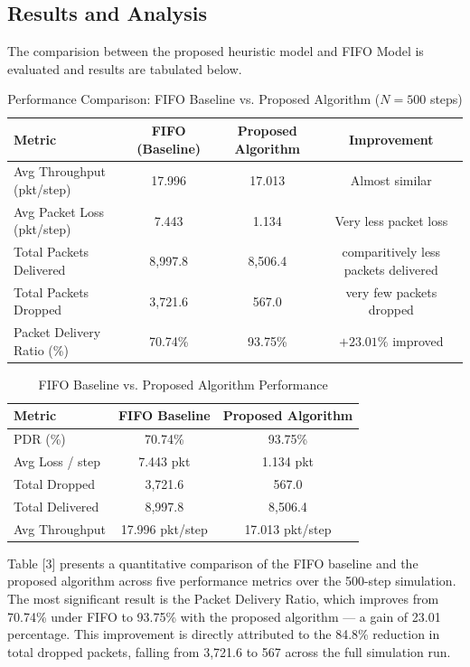 \documentclass[pdflatex,sn-mathphys-num]{sn-jnl}%
\theoremstyle{thmstyleone}%
\theoremstyle{thmstyletwo}%
\theoremstyle{thmstylethree}%
\begin{document}
\subsection{ Results and Analysis }

The comparision between the proposed heuristic model and FIFO Model is evaluated and results are tabulated below.
\begin{table}[h]
\centering
\small
\begin{tabular}{|l|c|c|c|}
\hline
\textbf{Metric} & \textbf{FIFO (Baseline)} & \textbf{Proposed Algorithm} & \textbf{Improvement} \\ \hline

Avg Throughput (pkt/step) & 17.996 & 17.013 & Almost similar \\ \hline
Avg Packet Loss (pkt/step) & 7.443 & 1.134 & Very less packet loss \\ \hline
Total Packets Delivered & 8,997.8 & 8,506.4 & comparitively less packets delivered \\ \hline
Total Packets Dropped & 3,721.6 & 567.0 & very few packets dropped \\ \hline
Packet Delivery Ratio (\%) & 70.74\% & 93.75\% & $+23.01\%$ improved \\ \hline

\end{tabular}
\caption{Performance Comparison: FIFO Baseline vs. Proposed Algorithm ($N = 500$ steps)}
\end{table}


\begin{table}[h]
\centering
\small
\begin{tabular}{|l|c|c|}
\hline
\textbf{Metric} & \textbf{FIFO Baseline} & \textbf{Proposed Algorithm} \\ \hline

PDR (\%) & 70.74\% & 93.75\% \\ \hline
Avg Loss / step & 7.443 pkt & 1.134 pkt \\ \hline
Total Dropped & 3,721.6 & 567.0 \\ \hline
Total Delivered & 8,997.8 & 8,506.4 \\ \hline
Avg Throughput & 17.996 pkt/step & 17.013 pkt/step \\ \hline

\end{tabular}
\caption{FIFO Baseline vs. Proposed Algorithm Performance}
\end{table}


Table [3] presents a quantitative comparison of the FIFO baseline and the proposed algorithm across five performance metrics over the 500-step simulation. The most significant result is the Packet Delivery Ratio, which improves from 70.74\% under FIFO to 93.75\% with the proposed algorithm — a gain of 23.01 percentage. This improvement is directly attributed to the 84.8\% reduction in total dropped packets, falling from 3,721.6 to 567 across the full simulation run.
\end{document}
